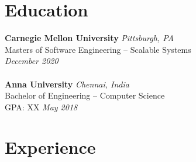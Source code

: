 \documentclass{resume}
\author{https://aravindvasu.dev}{Aravind Vasudevan}
\begin{document}
\begin{multicols*}{2}
[
\maketitle
]
\section*{Education}
\noindent
\textbf{Carnegie Mellon University} \hfill \textit{Pittsburgh, PA} \\
{\small Masters of Software Engineering -- Scalable Systems}  \\
\null\hfill \textit{\small December 2020} \\
\\
\textbf{Anna University} \hfill \textit{Chennai, India} \\
{\small Bachelor of Engineering -- Computer Science}  \\
\small{GPA: XX} \hfill \textit{May 2018}

\section*{Experience}
\noindent



\end{multicols*}
\end{document}
